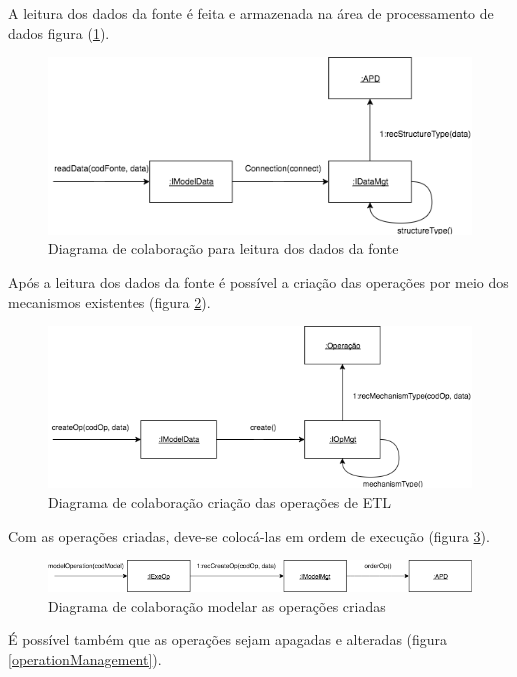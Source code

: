 A leitura dos dados da fonte é feita e armazenada na área de processamento de dados figura (\ref{readData}).

\begin{figure}[h!]
	\centering
	\includegraphics[scale=0.5]{fig/readData.png}
	\caption{Diagrama de colaboração para leitura dos dados da fonte}
	\label{readData}
\end{figure}

Após a leitura dos dados da fonte é possível a criação das operações por meio dos mecanismos existentes (figura \ref{createOp}).

\begin{figure}[h!]
	\centering
	\includegraphics[scale=0.5]{fig/createOp.png}
	\caption{Diagrama de colaboração criação das operações de ETL}
	\label{createOp}
\end{figure}

Com as operações criadas, deve-se colocá-las em ordem de execução (figura \ref{modelOperation}).

\begin{figure}[h!]
	\centering
	\includegraphics[scale=0.5]{fig/modelOperation.png}
	\caption{Diagrama de colaboração modelar as operações criadas}
	\label{modelOperation}
\end{figure}

É possível também que as operações sejam apagadas e alteradas (figura \ref{operationManagement}).

